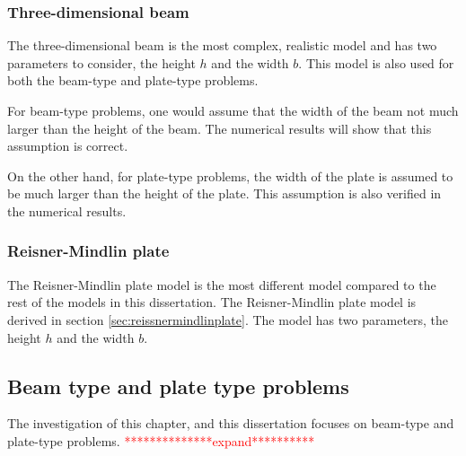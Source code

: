 \documentclass[../../main.tex]{subfiles}
\begin{document}
\subsubsection{Three-dimensional beam}

The three-dimensional beam is the most complex, realistic model and has two parameters to consider, the height $h$ and the width $b$. This model is also used for both the beam-type and plate-type problems.

For beam-type problems, one would assume that the width of the beam not much larger than the height of the beam. The numerical results will show that this assumption is correct.

On the other hand, for plate-type problems, the width of the plate is assumed to be much larger than the height of the plate. This assumption is also verified in the numerical results.

\subsubsection{Reisner-Mindlin plate}
The Reisner-Mindlin plate model is the most different model compared to the rest of the models in this dissertation. The Reisner-Mindlin plate model is derived in section \ref{sec:reissnermindlinplate}. The model has two parameters, the height $h$ and the width $b$.

\subsection{Beam type and plate type problems}
The investigation of this chapter, and this dissertation focuses on beam-type and plate-type problems. \textcolor{red}{**************expand**********}
\end{document}
